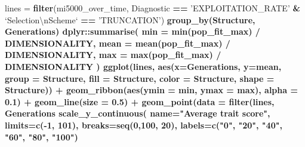\documentclass[]{book}
\newenvironment{Shaded}{\begin{snugshade}}{\end{snugshade}}
\newcommand{\CharTok}[1]{\textcolor[rgb]{0.31,0.60,0.02}{#1}}
\newcommand{\DataTypeTok}[1]{\textcolor[rgb]{0.13,0.29,0.53}{#1}}
\newcommand{\DecValTok}[1]{\textcolor[rgb]{0.00,0.00,0.81}{#1}}
\newcommand{\FloatTok}[1]{\textcolor[rgb]{0.00,0.00,0.81}{#1}}
\newcommand{\KeywordTok}[1]{\textcolor[rgb]{0.13,0.29,0.53}{\textbf{#1}}}
\newcommand{\NormalTok}[1]{#1}
\newcommand{\OperatorTok}[1]{\textcolor[rgb]{0.81,0.36,0.00}{\textbf{#1}}}
\newcommand{\StringTok}[1]{\textcolor[rgb]{0.31,0.60,0.02}{#1}}
\begin{document}
\begin{Shaded}
\begin{Highlighting}[]
\NormalTok{lines =}\StringTok{ }\KeywordTok{filter}\NormalTok{(mi5000_over_time, Diagnostic }\OperatorTok{==}\StringTok{ 'EXPLOITATION_RATE'} \OperatorTok{&}\StringTok{ `}\DataTypeTok{Selection}\CharTok{\textbackslash{}n}\DataTypeTok{Scheme}\StringTok{`} \OperatorTok{==}\StringTok{ 'TRUNCATION'}\NormalTok{) }\OperatorTok{%>%}
\StringTok{  }\KeywordTok{group_by}\NormalTok{(Structure, Generations) }\OperatorTok{%>%}
\StringTok{  }\NormalTok{dplyr}\OperatorTok{::}\KeywordTok{summarise}\NormalTok{(}
    \DataTypeTok{min =} \KeywordTok{min}\NormalTok{(pop_fit_max) }\OperatorTok{/}\StringTok{ }\NormalTok{DIMENSIONALITY,}
    \DataTypeTok{mean =} \KeywordTok{mean}\NormalTok{(pop_fit_max) }\OperatorTok{/}\StringTok{ }\NormalTok{DIMENSIONALITY,}
    \DataTypeTok{max =} \KeywordTok{max}\NormalTok{(pop_fit_max) }\OperatorTok{/}\StringTok{ }\NormalTok{DIMENSIONALITY}
\NormalTok{  )}
\KeywordTok{ggplot}\NormalTok{(lines, }\KeywordTok{aes}\NormalTok{(}\DataTypeTok{x=}\NormalTok{Generations, }\DataTypeTok{y=}\NormalTok{mean, }\DataTypeTok{group =}\NormalTok{ Structure, }\DataTypeTok{fill =}\NormalTok{ Structure, }\DataTypeTok{color =}\NormalTok{ Structure, }\DataTypeTok{shape =}\NormalTok{ Structure)) }\OperatorTok{+}
\StringTok{  }\KeywordTok{geom_ribbon}\NormalTok{(}\KeywordTok{aes}\NormalTok{(}\DataTypeTok{ymin =}\NormalTok{ min, }\DataTypeTok{ymax =}\NormalTok{ max), }\DataTypeTok{alpha =} \FloatTok{0.1}\NormalTok{) }\OperatorTok{+}
\StringTok{  }\KeywordTok{geom_line}\NormalTok{(}\DataTypeTok{size =} \FloatTok{0.5}\NormalTok{) }\OperatorTok{+}
\StringTok{  }\KeywordTok{geom_point}\NormalTok{(}\DataTypeTok{data =} \KeywordTok{filter}\NormalTok{(lines, Generations }\OperatorTok{%%}\StringTok{ }\DecValTok{2000} \OperatorTok{==}\StringTok{ }\DecValTok{0}\NormalTok{), }\DataTypeTok{size =} \FloatTok{2.5}\NormalTok{, }\DataTypeTok{stroke =} \FloatTok{2.0}\NormalTok{, }\DataTypeTok{alpha =} \FloatTok{1.0}\NormalTok{) }\OperatorTok{+}
\StringTok{  }\KeywordTok{scale_y_continuous}\NormalTok{(}
    \DataTypeTok{name=}\StringTok{"Average trait score"}\NormalTok{,}
    \DataTypeTok{limits=}\KeywordTok{c}\NormalTok{(}\OperatorTok{-}\DecValTok{1}\NormalTok{, }\DecValTok{101}\NormalTok{),}
    \DataTypeTok{breaks=}\KeywordTok{seq}\NormalTok{(}\DecValTok{0}\NormalTok{,}\DecValTok{100}\NormalTok{, }\DecValTok{20}\NormalTok{),}
    \DataTypeTok{labels=}\KeywordTok{c}\NormalTok{(}\StringTok{"0"}\NormalTok{, }\StringTok{"20"}\NormalTok{, }\StringTok{"40"}\NormalTok{, }\StringTok{"60"}\NormalTok{, }\StringTok{"80"}\NormalTok{, }\StringTok{"100"}\NormalTok{)}
}}}
\end{Highlighting}
\end{Shaded}
\end{document}
